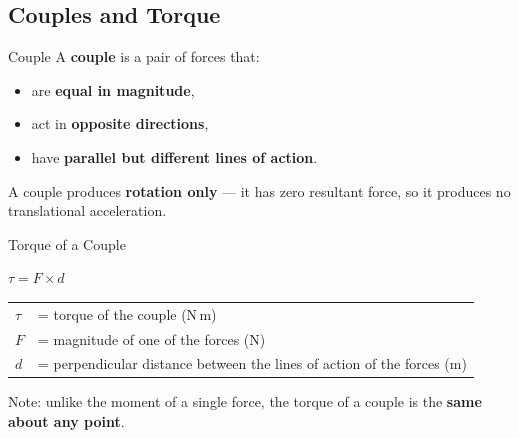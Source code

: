 \pagebreak

\subsection{Couples and Torque}

\begin{definitionbox}{Couple}
A \textbf{couple} is a pair of forces that:
\begin{itemize}[itemsep=2pt]
  \item are \textbf{equal in magnitude},
  \item act in \textbf{opposite directions},
  \item have \textbf{parallel but different lines of action}.
\end{itemize}
A couple produces \textbf{rotation only} — it has zero resultant force, so it produces no translational acceleration.
\end{definitionbox}

\begin{formulabox}{Torque of a Couple}
\begin{center}
\Large $\tau = F \times d$
\end{center}
\vspace{0.3em}
\begin{tabular}{@{}ll@{}}
$\tau$ & = torque of the couple (N\,m) \\
$F$   & = magnitude of one of the forces (N) \\
$d$   & = perpendicular distance between the lines of action of the forces (m) \\
\end{tabular}

\vspace{0.5em}
Note: unlike the moment of a single force, the torque of a couple is the \textbf{same about any point}.
\end{formulabox}

\vspace{4em}

\begin{center}
\end{center}

